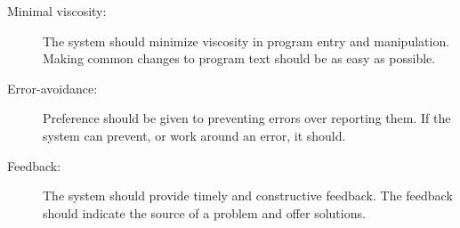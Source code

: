 {\begin{description}
\item[Minimal viscosity:] The system should minimize viscosity in
  program entry and manipulation. Making common changes to program
  text should be as easy as possible.

\item[Error-avoidance:] Preference should be given to preventing
  errors over reporting them. If the system can prevent, or work
  around an error, it should.

\item[Feedback:] The system should provide timely and constructive
  feedback. The feedback should indicate the source of a problem and
  offer solutions.

\end{description}
}
